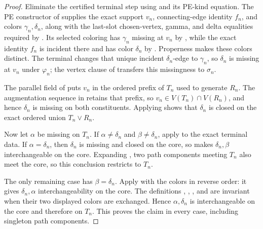 \begin{proof}
Eliminate the certified terminal step using
 and its PE-kind equation.  The PE constructor
of  supplies the exact support $v_n$,
connecting-edge identity $f_n$, and colors $\gamma_n,\delta_n$, along
with the last-slot chosen-vertex, gamma, and delta equalities required by
.  Its selected coloring has
$\gamma_n$ missing at $v_n$ by , while
the exact identity $f_n$ is incident there and has color $\delta_n$ by
.  Properness makes these colors
distinct.  The terminal  changes that
unique incident $\delta_n$-edge to $\gamma_n$, so $\delta_n$ is
missing at $v_n$ under $\varphi_n$; the vertex clause of
 transfers this missingness to
$\sigma_n$.

The parallel field of  puts $v_n$ in the
ordered prefix of $T_n$ used to generate $R_n$.  The augmentation
sequence in  retains that prefix, so
$v_n\in V(T_n)\cap V(R_n)$, and hence $\delta_n$ is missing on both
constituents.  Applying
 shows that $\delta_n$ is
closed on the exact ordered union $T_n\vee R_n$.

Now let $\alpha$ be missing on $T_n$.  If
$\alpha\ne\delta_n$ and $\beta\ne\delta_n$, apply
 to the exact terminal data.
If $\alpha=\delta_n$, then $\delta_n$ is missing and closed on the
core, so  makes
$\delta_n,\beta$ interchangeable on the core.  Expanding
, two path components meeting $T_n$ also
meet the core, so this conclusion restricts to $T_n$.

The only remaining case has $\beta=\delta_n$.  Apply
 with the colors in reverse order:
it gives $\delta_n,\alpha$ interchangeability on the core.
The definitions ,
, , and
 are invariant when their two displayed
colors are exchanged.  Hence $\alpha,\delta_n$ is interchangeable on
the core and therefore on $T_n$.  This proves the claim in every case,
including singleton path components.
\end{proof}
